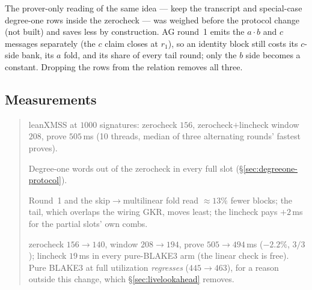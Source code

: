 \documentclass[11pt]{article}
\newenvironment{optsummary}{%
  \begin{quote}\small
  \begin{description}
  \setlength{\itemsep}{1pt}\setlength{\parsep}{0pt}\setlength{\topsep}{2pt}
}{%
  \end{description}
  \end{quote}
}
\begin{document}
The prover-only reading of the same idea --- keep the transcript and
special-case degree-one rows inside the zerocheck --- was weighed before
the protocol change (not built) and saves less by construction. AG round~1 emits the $a\cdot b$
and $c$ messages separately (the $c$ claim closes at $r_1$), so an
identity block still costs its $c$-side bank, its $a$ fold, and its share
of every tail round; only the $b$ side becomes a constant. Dropping the
rows from the relation removes all three.

\subsection{Measurements}\label{sec:degreeone-measure}

\begin{optsummary}
\item[Baseline:] leanXMSS at $1000$ signatures: zerocheck $156$, zerocheck$+$lincheck window $208$, prove $505\,$ms (10 threads, median of three alternating rounds' fastest proves).
\item[Improvement:] Degree-one words out of the zerocheck in every full slot (\S\ref{sec:degreeone-protocol}).
\item[Mechanism:] Round~1 and the skip$\to$multilinear fold read $\approx13\%$ fewer blocks; the tail, which overlaps the wiring GKR, moves least; the lincheck pays $+2\,$ms for the partial slots' own combs.
\item[Result:] zerocheck $156\to140$, window $208\to194$, prove $505\to494\,$ms ($-2.2\%$, $3/3$); lincheck $19\,$ms in every pure-BLAKE3 arm (the linear check is free). Pure BLAKE3 at full utilization \emph{regresses} ($445\to463$), for a reason outside this change, which \S\ref{sec:livelookahead} removes.
\end{optsummary}
\end{document}
